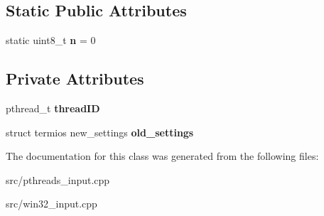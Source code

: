 \subsection*{Static Public Attributes}
\begin{DoxyCompactItemize}
\item 
\hypertarget{class_c_input_thread_ab294a9007beb875023ae813b30af0424}{
static uint8\_\-t {\bfseries n} = 0}
\label{class_c_input_thread_ab294a9007beb875023ae813b30af0424}

\end{DoxyCompactItemize}
\subsection*{Private Attributes}
\begin{DoxyCompactItemize}
\item 
\hypertarget{class_c_input_thread_a194d8b4dffd3108196430708b61bd7c0}{
pthread\_\-t {\bfseries threadID}}
\label{class_c_input_thread_a194d8b4dffd3108196430708b61bd7c0}

\item 
\hypertarget{class_c_input_thread_a618a2602b03e499b40e5d64e7c767c1e}{
struct termios new\_\-settings {\bfseries old\_\-settings}}
\label{class_c_input_thread_a618a2602b03e499b40e5d64e7c767c1e}

\end{DoxyCompactItemize}


The documentation for this class was generated from the following files:\begin{DoxyCompactItemize}
\item 
src/pthreads\_\-input.cpp\item 
src/win32\_\-input.cpp\end{DoxyCompactItemize}
